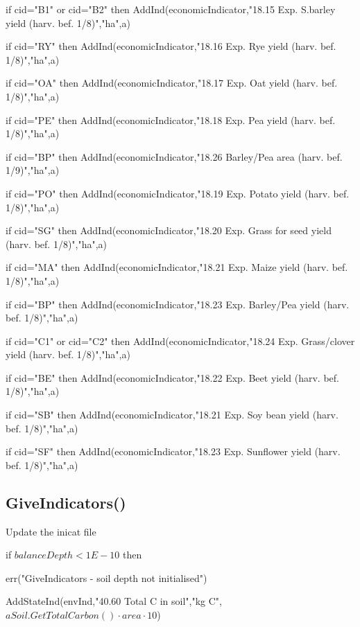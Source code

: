 \documentclass[%
]{scrartcl}
\begin{document}
{{{   if cid="B1" or cid="B2" then   
       AddInd(economicIndicator,"18.15 Exp. S.barley yield (harv. bef. 1/8)","ha",a)
  
   if cid="RY" then   
       AddInd(economicIndicator,"18.16 Exp. Rye yield (harv. bef. 1/8)","ha",a)
  
   if cid="OA" then   
     AddInd(economicIndicator,"18.17 Exp. Oat yield (harv. bef. 1/8)","ha",a)
  
   if cid="PE" then   
      AddInd(economicIndicator,"18.18 Exp. Pea yield (harv. bef. 1/8)","ha",a)
  
   if cid="BP" then   
	  	 AddInd(economicIndicator,"18.26 Barley/Pea area (harv. bef. 1/9)","ha",a)
 
   if cid="PO" then   
     AddInd(economicIndicator,"18.19 Exp. Potato yield (harv. bef. 1/8)","ha",a)
  
   if cid="SG" then     
      AddInd(economicIndicator,"18.20 Exp. Grass for seed yield (harv. bef. 1/8)","ha",a)
  
   if cid="MA" then   
      AddInd(economicIndicator,"18.21 Exp. Maize yield (harv. bef. 1/8)","ha",a)
  
   if cid="BP" then     
     AddInd(economicIndicator,"18.23 Exp. Barley/Pea yield (harv. bef. 1/8)","ha",a)
  
   if cid="C1" or cid="C2" then    
      AddInd(economicIndicator,"18.24 Exp. Grass/clover yield (harv. bef. 1/8)","ha",a)
 
   if cid="BE" then    
        AddInd(economicIndicator,"18.22 Exp. Beet yield (harv. bef. 1/8)","ha",a)
  
   if cid="SB" then   
       AddInd(economicIndicator,"18.21 Exp. Soy bean yield (harv. bef. 1/8)","ha",a)
 
   if cid="SF" then   
      AddInd(economicIndicator,"18.23 Exp. Sunflower yield (harv. bef. 1/8)","ha",a)








\subsection{GiveIndicators()}
Update the inicat file

   if $balanceDepth<1E-10$ then
   
      \quad  err("GiveIndicators - soil depth not initialised")

  AddStateInd(envInd,"40.60 Total C in soil","kg C",
$aSoil.GetTotalCarbon() \cdot area \cdot 10$)   
   
}}}
\end{document}
